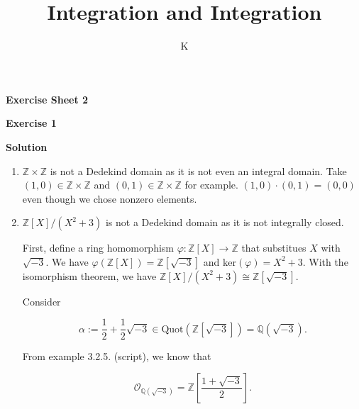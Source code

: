 \documentclass[a4paper]{article}
\title{Integration and Integration}
\author{K}
\theoremstyle{definition}
\begin{document}
\begin{center}
    \noindent\textbf{Exercise Sheet 2}
\end{center}
\noindent\textbf{Exercise 1}

\noindent\textbf{Solution}

\begin{enumerate}
    \item \(\mathbb{Z}\times\mathbb{Z}\) is not a Dedekind domain as it is not even an integral domain. Take \((1, 0) \in \mathbb{Z}\times\mathbb{Z}\) and \((0, 1) \in \mathbb{Z}\times\mathbb{Z}\) for example. \((1, 0) \cdot (0, 1) = (0, 0)\) even though we chose nonzero elements.
    \item \(\mathbb{Z}[X] / (X^2 + 3)\) is not a Dedekind domain as it is not integrally closed.

    First, define a ring homomorphism \(\varphi: \mathbb{Z}[X] \rightarrow \mathbb{Z}\) that substitues \(X\) with \(\sqrt{-3}\). We have \(\varphi(\mathbb{Z}[X]) = \mathbb{Z}[\sqrt{-3}]\) and \(\text{ker} (\varphi) = X^2 + 3\). With the isomorphism theorem, we have \(\mathbb{Z}[X] / (X^2 + 3) \cong \mathbb{Z}[\sqrt{-3}]\).

    Consider

    \begin{equation}
        \alpha := \frac{1}{2} + \frac{1}{2} \sqrt{-3} \in \text{Quot}(\mathbb{Z}[\sqrt{-3}]) = \mathbb{Q}(\sqrt{-3}) \text{.}
    \end{equation}

    From example 3.2.5. (script), we know that

    \begin{equation}
        \mathcal{O}_{\mathbb{Q}(\sqrt{-3})} = \mathbb{Z}\left[\frac{1 + \sqrt{-3}}{2}\right] \text{.}
    \end{equation}
    
    
    

\end{enumerate}
\end{document}
